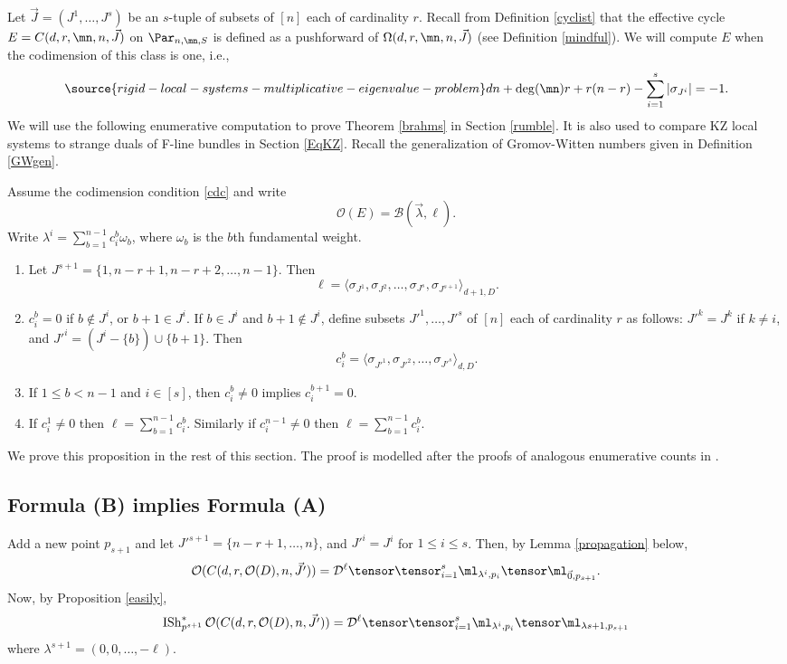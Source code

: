 \label{enume}
Let $\vec{J}=(J^1,\dots,J^s)$ be an $s$-tuple of subsets  of $[n]$ each of cardinality $r$. Recall from Definition \ref{cyclist} that the effective cycle $E=C(d,r,\mn,n,\vec{J})$ on $\Par_{n,\mn,S}$ is defined as a pushforward of
$\Omega(d,r,\mn,n,\vec{J})$ (see Definition  \ref{mindful}).  We will compute $E$ when the codimension of this class is one, i.e.,
\begin{equation}\label{cdc}
\source{rigid-local-systems-multiplicative-eigenvalue-problem}
dn +\deg(\mn)r +r(n-r)-\sum_{i=1}^s |\sigma_{J^i}|=-1.
\end{equation}
We will use the following enumerative computation to prove Theorem \ref{brahms} in Section \ref{rumble}. It is also used to compare KZ local systems to strange duals of F-line bundles in Section \ref{EqKZ}. Recall the generalization of Gromov-Witten numbers given in  Definition \ref{GWgen}.
\begin{proposition}
\notready\label{enumerative}
Assume the codimension condition \eqref{cdc} and
write
$$\mathcal{O}(E)=\mathcal{B}(\vec{\lambda},\ell).$$
Write $\lambda^i=\sum_{b=1}^{n-1} c_{i}^{b}\omega_b$, where $\omega_b$ is the $b$th fundamental weight.
\begin{enumerate}
\item[(A)] Let $J^{s+1}=\{1,n-r+1,n-r+2,\dots,n-1\}$. Then
$$\ell=\langle\sigma_{J^1}, \sigma_{J^2},\dots,\sigma_{J^s},\sigma_{J^{s+1}}\rangle_{d+1,D}.$$
\item[(B)] $c_{i}^{b}=0$ if $b\not\in J^i$, or $b+1\in J^i$. If $b\in J^i$ and $b+1\not\in J^i$, define subsets $J'^1,\dots,J'^s$ of $[n]$
 each of cardinality $r$ as follows: $J'^k=J^k$ if $k\neq i$, and $J'^i=(J^i-\{b\})\cup \{b+1\}$. Then
$$c_i^{b}= \langle\sigma_{J'^1}, \sigma_{J'^2},\dots,\sigma_{J'^s}\rangle_{d,D}.$$
\item[(C)] If $1\leq b<n-1$ and $i\in[s]$, then $c^b_i\neq 0$ implies $c^{b+1}_i=0$.
\item[(D)] If $c^1_i\neq 0$ then $\ell=\sum_{b=1}^{n-1} c^b_i$.  Similarly if $c^{n-1}_i\neq 0$ then $\ell=\sum_{b=1}^{n-1} c^b_i$.
\end{enumerate}
\end{proposition}
We prove this proposition in the rest of this section. The  proof is modelled after the proofs of analogous enumerative counts in \cite{BHermit,BKiers,Kiers}.
\subsection{Formula (B) implies Formula (A)}
Add a new point $p_{s+1}$ and let $J'^{s+1}=\{n-r+1,\dots, n\}$, and $J'^i=J^i$ for $1\leq i \leq s$. Then, by Lemma \ref{propagation} below,
$$\mathcal{O}(C(d,r,\mathcal{O}(D),n,\vec{J'}))=\mathcal{D}^{\ell}\tensor\tensor_{i=1}^s\ml_{\lambda^i,p_i}\tensor \ml_{\vec{0},p_{s+1}}.$$
Now, by Proposition \ref{easily},
$$\operatorname{ISh}_{p^{s+1}}^*\mathcal{O}(C(d,r,\mathcal{O}(D),n,\vec{J'}))=\mathcal{D}^{\ell}\tensor\tensor_{i=1}^s\ml_{\lambda^i,p_i}\tensor\ml_{\lambda{s+1},p_{s+1}}$$
where $\lambda^{s+1}=(0,0,\dots,-\ell)$.

